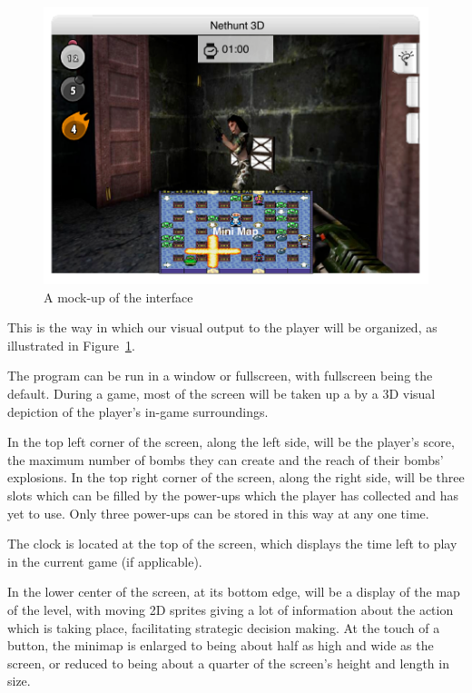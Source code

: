 \begin{figure}[!ht]
  \centering
\includegraphics[width=\textwidth]{diagrams/interface}
  \caption{A mock-up of the interface} \label{fig:interface}
\end{figure}
\label{interface}

This is the way in which our visual output to the player will be organized, as illustrated in Figure~\ref{fig:interface}.

The program can be run in a window or fullscreen, with fullscreen being the default. During a game, most of the screen will be taken up a by a 3D visual depiction of the player's in-game surroundings.

In the top left corner of the screen, along the left side, will be the player's score, the maximum number of bombs they can create and the reach of their bombs' explosions. In the top right corner of the screen, along the right side, will be three slots which can be filled by the power-ups which the player has collected and has yet to use. Only three power-ups can be stored in this way at any one time.

The clock is located at the top of the screen, which displays the time left to play in the current game (if applicable).

In the lower center of the screen, at its bottom edge, will be a display of the map of the level, with moving 2D sprites giving a lot of information about the action which is taking place, facilitating strategic decision making. At the touch of a button, the minimap is enlarged to being about half as high and wide as the screen, or reduced to being about a quarter of the screen's height and length in size.

